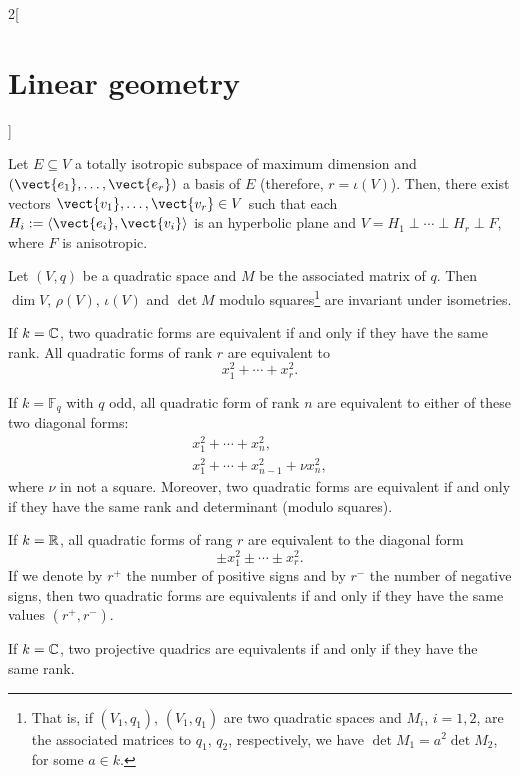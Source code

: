 \documentclass[../../../main.tex]{subfiles}
\begin{document}
\begin{multicols}{2}[\section{Linear geometry}]
\begin{theorem}
Let $E\subseteq V$ a totally isotropic subspace of maximum dimension and $(\vect{e_1},\ldots,\vect{e_r})$ a basis of $E$ (therefore, $r=\iota(V)$). Then, there exist vectors $\vect{v_1},\ldots,\vect{v_r}\in V$ such that each $H_i:=\langle\vect{e_i},\vect{v_i}\rangle$ is an hyperbolic plane and $V=H_1\perp\cdots\perp H_r\perp F$, where $F$ is anisotropic.
\end{theorem}
\begin{prop}
Let $(V,q)$ be a quadratic space and $M$ be the associated matrix of $q$. Then $\dim V$, $\rho(V)$, $\iota (V)$ and $\det M$ modulo squares\footnote{That is, if $(V_1,q_1)$, $(V_1,q_1)$ are two quadratic spaces and $M_i$, $i=1,2$, are the associated matrices to $q_1$, $q_2$, respectively, we have $\det M_1=a^2\det M_2$, for some $a\in k$.} are invariant under isometries. 
\end{prop}
\begin{theorem}
If $k=\mathbb{C} $, two quadratic forms are equivalent if and only if they have the same rank. All quadratic forms of rank $r$ are equivalent to $$x_1^2+\cdots+x_r^2.$$
\end{theorem}
\begin{theorem}
If $k=\mathbb{F}_q$ with $q$ odd, all quadratic form
of rank $n$ are equivalent to either of these two diagonal forms: 
\begin{gather*}
    x_1^2+\cdots+ x_n^2,\\
    x_1^2+\cdots+ x_{n-1}^2+\nu x_n^2,
\end{gather*}
where $\nu$ in not a square. Moreover, two quadratic forms are equivalent if and only if they have the same rank and determinant (modulo squares).
\end{theorem}
\begin{theorem}
If $k=\mathbb{R} $, all quadratic forms
of rang $r$ are equivalent to the diagonal form 
$$\pm x_1^2\pm\cdots\pm x_r^2.$$ If we denote by $r^+$ the number of positive signs and by $r^-$ the number of negative signs, then two quadratic forms are equivalents if and only if they have the same values $(r^+,r^-)$.
\end{theorem}
\begin{theorem}
If $k=\mathbb{C} $, two projective quadrics are equivalents if and only if they have the same rank.
\end{theorem}
\begin{theorem}

\end{theorem}
\end{multicols}
\end{document}
